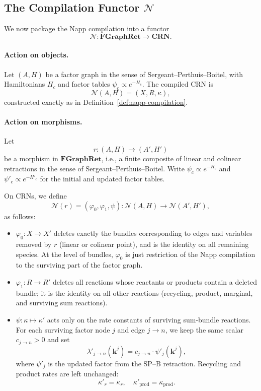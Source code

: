 \documentclass{article}
\theoremstyle{plain}
\theoremstyle{definition}
\theoremstyle{remark}
\newcommand{\<}{\langle}
\renewcommand{\>}{\rangle}
\begin{document}
\subsection{The Compilation Functor $\mathcal{N}$}

We now package the Napp compilation into a functor
\[
\mathcal{N} : \mathbf{FGraphRet} \longrightarrow \mathbf{CRN}.
\]

\paragraph{Action on objects.}
Let $(A, H)$ be a factor graph in the sense of Sergeant--Perthuis--Boitel, with 
Hamiltonians $H_c$ and factor tables $\psi_c \propto e^{-H_c}$. The compiled CRN is
\[
\mathcal{N}(A, H) = (X, R, \kappa),
\]
constructed exactly as in Definition~\ref{def:napp-compilation}.

\paragraph{Action on morphisms.}
Let
\[
r : (A, H) \longrightarrow (A', H')
\]
be a morphism in $\mathbf{FGraphRet}$, i.e., a finite composite of linear and colinear 
retractions in the sense of Sergeant--Perthuis--Boitel. Write $\psi_c \propto e^{-H_c}$ 
and $\psi'_c \propto e^{-H'_c}$ for the initial and updated factor tables.

On CRNs, we define
\[
\mathcal{N}(r) = (\varphi_0, \varphi_1, \psi) : \mathcal{N}(A, H) \to \mathcal{N}(A', H'),
\]
as follows:
\begin{itemize}
\item $\varphi_0 : X \to X'$ deletes exactly the bundles corresponding to edges and 
variables removed by $r$ (linear or colinear point), and is the identity on all 
remaining species. At the level of bundles, $\varphi_0$ is just restriction of the 
Napp compilation to the surviving part of the factor graph.

\item $\varphi_1 : R \to R'$ deletes all reactions whose reactants or products contain 
a deleted bundle; it is the identity on all other reactions (recycling, product, 
marginal, and surviving sum reactions).

\item $\psi : \kappa \mapsto \kappa'$ acts only on the rate constants of surviving 
sum-bundle reactions. For each surviving factor node $j$ and edge $j \to n$, we keep 
the same scalar $c_{j \to n} > 0$ and set
\[
\lambda'_{j \to n}(\mathbf{k}^j) = c_{j \to n} \cdot \psi'_j(\mathbf{k}^j),
\]
where $\psi'_j$ is the updated factor from the SP--B retraction. Recycling and product 
rates are left unchanged:
\[
\kappa'_r = \kappa_r, \quad \kappa'_{\mathrm{prod}} = \kappa_{\mathrm{prod}}.
\]
\end{itemize}
\end{document}

